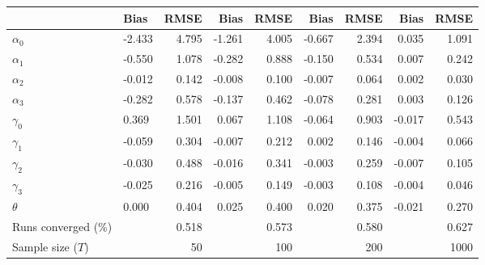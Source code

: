 
\begin{tabular}[t]{llrrrrrrr}
\toprule
  & Bias & RMSE & Bias & RMSE & Bias & RMSE & Bias & RMSE\\
\midrule
$\alpha_{0}$ & -2.433 & 4.795 & -1.261 & 4.005 & -0.667 & 2.394 & 0.035 & 1.091\\
$\alpha_{1}$ & -0.550 & 1.078 & -0.282 & 0.888 & -0.150 & 0.534 & 0.007 & 0.242\\
$\alpha_{2}$ & -0.012 & 0.142 & -0.008 & 0.100 & -0.007 & 0.064 & 0.002 & 0.030\\
$\alpha_{3}$ & -0.282 & 0.578 & -0.137 & 0.462 & -0.078 & 0.281 & 0.003 & 0.126\\
$\gamma_{0}$ & 0.369 & 1.501 & 0.067 & 1.108 & -0.064 & 0.903 & -0.017 & 0.543\\
$\gamma_{1}$ & -0.059 & 0.304 & -0.007 & 0.212 & 0.002 & 0.146 & -0.004 & 0.066\\
$\gamma_{2}$ & -0.030 & 0.488 & -0.016 & 0.341 & -0.003 & 0.259 & -0.007 & 0.105\\
$\gamma_{3}$ & -0.025 & 0.216 & -0.005 & 0.149 & -0.003 & 0.108 & -0.004 & 0.046\\
$\theta$ & 0.000 & 0.404 & 0.025 & 0.400 & 0.020 & 0.375 & -0.021 & 0.270\\
Runs converged (\%) &  & 0.518 &  & 0.573 &  & 0.580 &  & 0.627\\
Sample size ($T$) &  & 50 &  & 100 &  & 200 &  & 1000\\
\bottomrule
\end{tabular}
